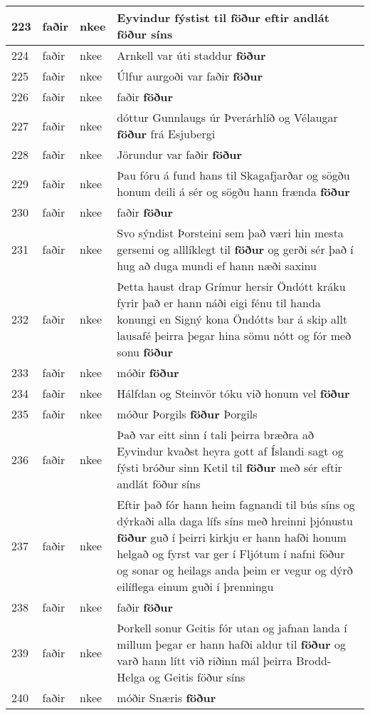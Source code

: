 \documentclass{article}
\begin{document}
\begin{longtable}{p{1cm}|p{1cm}|p{1cm}|p{13cm}}
\hline
223&faðir&nkee&Eyvindur fýstist til \textbf{föður} eftir andlát föður síns\\
\hline
224&faðir&nkee&Arnkell var úti staddur \textbf{föður} \\
\hline
225&faðir&nkee&Úlfur aurgoði var faðir \textbf{föður} \\
\hline
226&faðir&nkee&faðir \textbf{föður} \\
\hline
227&faðir&nkee&dóttur Gunnlaugs úr Þverárhlíð og Vélaugar \textbf{föður} frá Esjubergi\\
\hline
228&faðir&nkee&Jörundur var faðir \textbf{föður} \\
\hline
229&faðir&nkee&Þau fóru á fund hans til Skagafjarðar og sögðu honum deili á sér og sögðu hann frænda \textbf{föður} \\
\hline
230&faðir&nkee&faðir \textbf{föður} \\
\hline
231&faðir&nkee&Svo sýndist Þorsteini sem það væri hin mesta gersemi og alllíklegt til \textbf{föður} og gerði sér það í hug að duga mundi ef hann næði saxinu\\
\hline
232&faðir&nkee&Þetta haust drap Grímur hersir Öndótt kráku fyrir það er hann náði eigi fénu til handa konungi en Signý kona Öndótts bar á skip allt lausafé þeirra þegar hina sömu nótt og fór með sonu \textbf{föður} \\
\hline
233&faðir&nkee&móðir \textbf{föður} \\
\hline
234&faðir&nkee&Hálfdan og Steinvör tóku við honum vel \textbf{föður} \\
\hline
235&faðir&nkee&móður Þorgils \textbf{föður} Þorgils\\
\hline
236&faðir&nkee&Það var eitt sinn í tali þeirra bræðra að Eyvindur kvaðst heyra gott af Íslandi sagt og fýsti bróður sinn Ketil til \textbf{föður} með sér eftir andlát föður síns\\
\hline
237&faðir&nkee&Eftir það fór hann heim fagnandi til bús síns og dýrkaði alla daga lífs síns með hreinni þjónustu \textbf{föður} guð í þeirri kirkju er hann hafði honum helgað og fyrst var ger í Fljótum í nafni föður og sonar og heilags anda þeim er vegur og dýrð eilíflega einum guði í þrenningu\\
\hline
238&faðir&nkee&faðir \textbf{föður} \\
\hline
239&faðir&nkee&Þorkell sonur Geitis fór utan og jafnan landa í millum þegar er hann hafði aldur til \textbf{föður} og varð hann lítt við riðinn mál þeirra Brodd-Helga og Geitis föður síns\\
\hline
240&faðir&nkee&móðir Snæris \textbf{föður} \\

\end{longtable}
\end{document}
